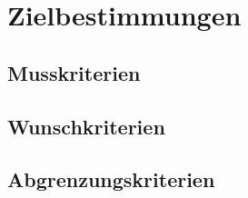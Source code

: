 \section{Zielbestimmungen}
\subsection{Musskriterien}
\subsection{Wunschkriterien}
\subsection{Abgrenzungskriterien}